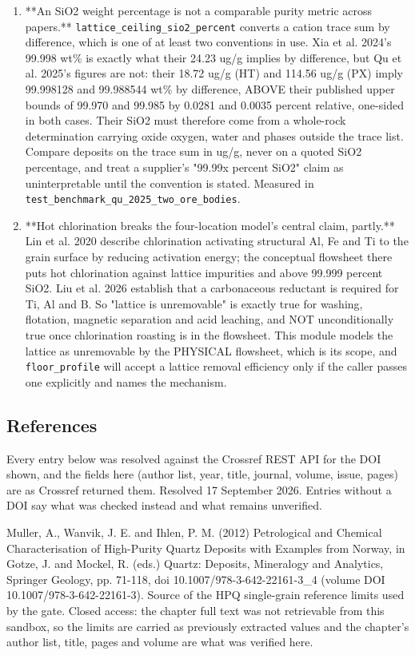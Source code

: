 \documentclass[10pt,a4paper,twoside]{report}
\begin{document}
\begin{enumerate}[leftmargin=*,label=\arabic*.]
\item **An SiO2 weight percentage is not a comparable purity metric across papers.** \texttt{lattice\_ceiling\_sio2\_percent} converts a cation trace sum by difference, which is one of at least two conventions in use. Xia et al. 2024's 99.998 wt\% is exactly what their 24.23 ug/g implies by difference, but Qu et al. 2025's figures are not: their 18.72 ug/g (HT) and 114.56 ug/g (PX) imply 99.998128 and 99.988544 wt\% by difference, ABOVE their published upper bounds of 99.970 and 99.985 by 0.0281 and 0.0035 percent relative, one-sided in both cases. Their SiO2 must therefore come from a whole-rock determination carrying oxide oxygen, water and phases outside the trace list. Compare deposits on the trace sum in ug/g, never on a quoted SiO2 percentage, and treat a supplier's "99.99x percent SiO2" claim as uninterpretable until the convention is stated. Measured in \texttt{test\_benchmark\_qu\_2025\_two\_ore\_bodies}.
\item **Hot chlorination breaks the four-location model's central claim, partly.** Lin et al. 2020 describe chlorination activating structural Al, Fe and Ti to the grain surface by reducing activation energy; the conceptual flowsheet there puts hot chlorination against lattice impurities and above 99.999 percent SiO2. Liu et al. 2026 establish that a carbonaceous reductant is required for Ti, Al and B. So "lattice is unremovable" is exactly true for washing, flotation, magnetic separation and acid leaching, and NOT unconditionally true once chlorination roasting is in the flowsheet. This module models the lattice as unremovable by the PHYSICAL flowsheet, which is its scope, and \texttt{floor\_profile} will accept a lattice removal efficiency only if the caller passes one explicitly and names the mechanism.
\end{enumerate}

\subsection*{References}

Every entry below was resolved against the Crossref REST API for the DOI shown, and the fields here (author list, year, title, journal, volume, issue, pages) are as Crossref returned them. Resolved 17 September 2026. Entries without a DOI say what was checked instead and what remains unverified.

Muller, A., Wanvik, J. E. and Ihlen, P. M. (2012) Petrological and Chemical Characterisation of High-Purity Quartz Deposits with Examples from Norway, in Gotze, J. and Mockel, R. (eds.) Quartz: Deposits, Mineralogy and Analytics, Springer Geology, pp. 71-118, doi 10.1007/978-3-642-22161-3\_4 (volume DOI 10.1007/978-3-642-22161-3). Source of the HPQ single-grain reference limits used by the gate. Closed access: the chapter full text was not retrievable from this sandbox, so the limits are carried as previously extracted values and the chapter's author list, title, pages and volume are what was verified here.
\end{document}
